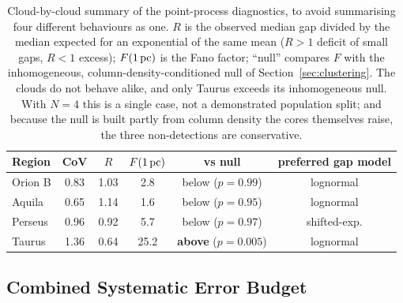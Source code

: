 \documentclass[usenatbib,twoside,twocolumn]{mnras}
\begin{document}
\begin{table}
\caption{Cloud-by-cloud summary of the point-process diagnostics, to avoid summarising four different behaviours as one. $R$ is the observed median gap divided by the median expected for an exponential of the same mean ($R>1$ deficit of small gaps, $R<1$ excess); $F(1\,{\rm pc})$ is the Fano factor; ``null'' compares $F$ with the inhomogeneous, column-density-conditioned null of Section~\ref{sec:clustering}. The clouds do not behave alike, and only Taurus exceeds its inhomogeneous null. With $N=4$ this is a single case, not a demonstrated population split; and because the null is built partly from column density the cores themselves raise, the three non-detections are conservative.}
\label{tab:percloud}
\footnotesize
\setlength{\tabcolsep}{3.5pt}
\begin{tabular}{lccccc}
\toprule
Region & CoV & $R$ & $F(1\,{\rm pc})$ & vs null & preferred gap model \\
\midrule
Orion B & 0.83 & 1.03 & 2.8 & below ($p=0.99$) & lognormal \\
Aquila  & 0.65 & 1.14 & 1.6 & below ($p=0.95$) & lognormal \\
Perseus & 0.96 & 0.92 & 5.7 & below ($p=0.97$) & shifted-exp. \\
Taurus  & 1.36 & 0.64 & 25.2 & \textbf{above} ($p=0.005$) & lognormal \\
\bottomrule
\end{tabular}
\end{table}

\subsection{Combined Systematic Error Budget}
\label{sec:error_budget}
\end{document}
